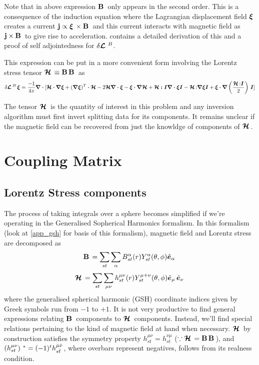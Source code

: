 Note that in above expression $\mathbf{B}\,$ only appears in the second order. This is a consequence of the induction equation where the Lagrangian displacement field $\bm{\xi}\,$ creates a current $\mathbf{j} \propto \bm{\xi}\, \times \mathbf{B}\,$ and this current interacts with magnetic field as $\mathbf{j} \times \mathbf{B}\,$ to give rise to acceleration. \cite{goedbloed2004} contains a detailed derivation of this and a proof of self adjointedness for $\delta \bm{\mathcal{L}}\,\,^B$.

This expression can be put in a more convenient form involving the Lorentz stress tensor $\bm{\mathcal{H}}\, \equiv \mathbf{B}\,\mathbf{B}\,$ as
\begin{equation} \label{eqn: mag_pert_H}
    \delta \bm{\mathcal{L}}\,^{B}\, \boldsymbol{\xi} = \frac{-1}{4\pi}\boldsymbol{\nabla\cdot} [\boldsymbol{\mathcal{H}\cdot\nabla \xi} + (\boldsymbol{\nabla \xi})^T \boldsymbol{\cdot \mathcal{H}} - 2\boldsymbol{\mathcal{H}\nabla \cdot \xi} - \boldsymbol{\xi \cdot \nabla \mathcal{H}} + \boldsymbol{\mathcal{H}:I \nabla \cdot \xi I} - \bm{\mathcal{H}}\,{:}\boldsymbol{\nabla \xi I} + \boldsymbol{\xi \cdot \nabla} \left( \frac{\bm{\mathcal{H}}\,{:}\boldsymbol{I}}{2} \right)\,\boldsymbol{I}]
\end{equation}

The tensor $\bm{\mathcal{H}}\,$ is the quantity of interest in this problem and any inversion algorithm must first invert splitting data for its components. It remains unclear if the magnetic field can be recovered from just the knowldge of components of $\bm{\mathcal{H}}\,$.

\section{Coupling Matrix}
\subsection{Lorentz Stress components}\label{sec:lorentz_stress_comps}
The process of taking integrals over a sphere becomes simplified if we're operating in the Generalised Sopherical Harmonics formalism. In this formalism (look at \ref{app_gsh} for basis of this formalism), magnetic field and Lorentz stress are decomposed as
$$\mathbf{B}\, = \sum_{st}\sum_{\alpha} B^{\alpha}_{st}(r) Y_{st}^{\alpha}(\theta,\phi) \hat{\bm{e}}_{\alpha}\,$$
$$\bm{\mathcal{H}}\, = \sum_{st}\sum_{\mu\nu} h_{st}^{\mu\nu}(r) Y^{\mu+\nu}_{st}(\theta,\phi) \hat{\bm{e}}_{\mu}\,\hat{\bm{e}}_{\nu}\,$$
where the generalised spherical harmonic (GSH) coordinate indices given by Greek symbols run from $-1$ to $+1$.
It is not very productive to find general expressions relating $\mathbf{B}\,$ components to $\bm{\mathcal{H}}\,$ components. Instead, we'll find special relations pertaining to the kind of magnetic field at hand when necessary. $\bm{\mathcal{H}}\,$ by construction satisfies the symmetry property $h^{\mu\nu}_{st} = h^{\nu\mu}_{st}$ ($\because \bm{\mathcal{H}}\, = \mathbf{B}\,\mathbf{B}\,$), and $\left( h^{\mu\nu}_{st} \right)\,^* = (-1)^t h_{s\bar{t}}^{\bar{\mu}\bar{\nu}}$, where overbars represent negatives, follows from its realness condition.

